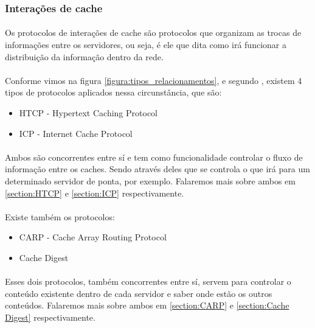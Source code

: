 \subsubsection{Intera\c{c}\~oes de cache}

\paragraph{} Os protocolos de intera\c{c}\~oes de cache s\~ao protocolos que organizam as trocas de informa\c{c}\~oes entre os servidores, ou seja, \'e ele que dita como ir\'a funcionar a distribui\c{c}\~ao da informa\c{c}\~ao dentro da rede.
\paragraph{} Conforme vimos na figura \ref{figura:tipos_relacionamentos}, e segundo \cite{pathan2007taxonomy}, existem 4 tipos de protocolos aplicados nessa circunst\^ancia, que s\~ao:
\begin{itemize}
\item HTCP - Hypertext Caching Protocol
\item ICP - Internet Cache Protocol
\end{itemize}
\paragraph{} Ambos s\~ao concorrentes entre s\'i e tem como funcionalidade controlar o fluxo de informa\c{c}\~ao entre os caches. Sendo atrav\'es deles que se controla o que ir\'a para um determinado servidor de ponta, por exemplo. Falaremos mais sobre ambos em \ref{section:HTCP} e \ref{section:ICP} respectivamente.
\paragraph{} Existe tamb\'em os protocolos:
\begin{itemize}
\item CARP -  Cache Array Routing Protocol
\item Cache Digest
\end{itemize}
\paragraph{} Esses dois protocolos, tamb\'em concorrentes entre s\'i, servem para controlar o conte\'udo existente dentro de cada servidor e saber onde est\~ao os outros conte\'udos. Falaremos mais sobre ambos em \ref{section:CARP} e \ref{section:Cache Digest} respectivamente.

